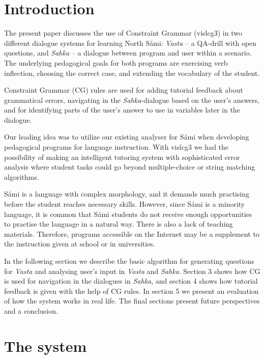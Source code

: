 \documentclass[11pt]{article}
\begin{document}
\section{Introduction} 

The present paper discusses the use of Constraint Grammar (vislcg3) in two different dialogue systems for learning North Sámi: \textit{Vasta} -- a QA-drill with open questions, and \textit{Sahka} -- a  dialogue between program and user within a scenario. The underlying pedagogical goals for both programs are exercising verb inflection, choosing the correct case, and extending the vocabulary of the student. 

Constraint Grammar (CG) rules are used for adding tutorial feedback about grammatical errors, navigating in the \textit{Sahka}-dialogue based on the user's answers, and for identifying parts of the user's answer to use in variables later in the dialogue. 

Our leading idea was to utilize our existing analyser for Sámi when developing pedagogical programs for language instruction. With vislcg3 we had the possibility of making an intelligent tutoring system with sophisticated error analysis where student tasks could go beyond multiple-choice or string matching algorithms. 

Sámi is a language with complex morphology, and it demands much practising before the student reaches necessary skills. However, since Sámi is a minority language, it is common that Sámi students do not receive enough opportunities to practise the language in a natural way. There is also a lack of teaching materials. Therefore, programs accessible on the Internet may be a supplement to the instruction given at school or in universities. 

In the following section we describe the basic algorithm for generating questions for \textit{Vasta} and analysing user's input in \textit{Vasta} and \textit{Sahka}. Section 3 shows how CG is used for navigation in the dialogues in \textit{Sahka}, and section 4 shows how tutorial feedback is given with the help of CG rules. In section 5 we present an evaluation of how the system works in real life. The final sections present future perspectives and a conclusion.

\section{The system}
\end{document}
